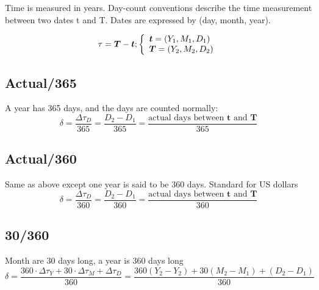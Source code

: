 \documentclass[11pt,a4paper]{article}
\numberwithin{equation}{section}
\begin{document}


	Time is measured in years. Day-count conventions describe the time measurement between two
	dates t and T. Dates are expressed by (day, month, year).

	\[ \tau = \boldsymbol{T} - \boldsymbol{t};  \left\{
	  \begin{array}{l l}
		  \boldsymbol{t} = (Y_1, M_1, D_1) \\
	\boldsymbol{T}=(Y_2,M_2,D_2)
	  \end{array} \right.\]


	\subsection{Actual/365}
	A year has 365 days, and the days are counted normally:
	\[
	\delta = \frac{\Delta \tau_D}{365} = \frac{D_2-D_1}{365} = \frac{\text{actual days between } \boldsymbol{t} \text{ and } \boldsymbol{T}}{365}
	\]


	\subsection{Actual/360}
	Same as above except one year is said to be 360 days. Standard for US dollars
	\[
	\delta = \frac{\Delta \tau_D}{360} =\frac{D_2-D_1}{360} = \frac{\text{actual days between } \boldsymbol{t} \text{ and } \boldsymbol{T}}{360}
	\]


	\subsection{30/360}
	Month are 30 days long, a year is 360 days long
	\[
	\delta = \frac{360 \cdot \Delta \tau_Y + 30 \cdot \Delta \tau_M + \Delta \tau_D}{360} =\frac{360(Y_2-Y_2)+30(M_2-M_1)+(D_2-D_1)}{360}
	\]
\end{document}
